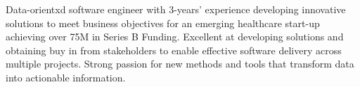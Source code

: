 

\begin{cvparagraph}

Data-orientxd software engineer with 3-years’ experience developing innovative solutions to meet business objectives for an emerging healthcare start-up achieving over 75M in Series B Funding. Excellent at developing solutions and obtaining buy in from stakeholders to enable effective software delivery across multiple projects. Strong passion for new methods and tools that transform data into actionable information.
\end{cvparagraph}
